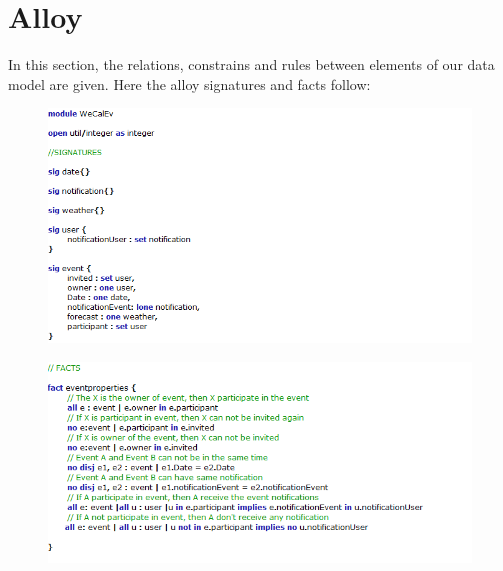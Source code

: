 \newpage
\section{Alloy}
\qquad In this section, the relations, constrains and rules between elements of our data model are given. Here the alloy signatures and facts follow:\newline 
\begin{figure}[tbh]
  \begin{l}
  \includegraphics[width=150mm]{Code1}
  \end{l}
\end{figure}

\begin{figure}[tbh]
  \begin{l}
  \includegraphics[width=150mm]{Code2}
  \end{l}
\end{figure}
\newpage

